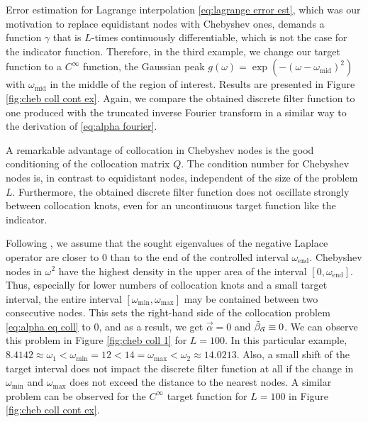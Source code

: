 \documentclass[a4paper,11pt,bibliography=totoc,listof=totoc,headinclude=true,cleardoublepage=empty,oneside]{scrbook}
\newcommand{\dffv}{\Tilde{\beta}_{\Vec{\alpha}}}
\newcommand{\e}{\mathrm{end}}
\begin{document}

\newpage
Error estimation for Lagrange interpolation \eqref{eq:lagrange error est}, which was our motivation to replace equidistant nodes with Chebyshev ones, demands a function $\gamma$ that is $L$-times continuously differentiable, which is not the case for the indicator function. Therefore, in the third example, we change our target function to a $C^\infty$ function, the Gaussian peak $g(\omega) = \exp\left(-(\omega-\omega_{\mathrm{mid}})^2\right)$ with $\omega_{\mathrm{mid}}$ in the middle of the region of interest. Results are presented in Figure \ref{fig:cheb coll cont ex}. Again, we compare the obtained discrete filter function to one produced with the truncated inverse Fourier transform in a similar way to the derivation of \eqref{eq:alpha fourier}.

A remarkable advantage of collocation in Chebyshev nodes is the good conditioning of the collocation matrix $Q$. The condition number for Chebyshev nodes is, in contrast to equidistant nodes, independent of the size of the problem $L$. Furthermore, the obtained discrete filter function does not oscillate strongly between collocation knots, even for an uncontinuous target function like the indicator.

Following \cite{nannen}, we assume that the sought eigenvalues of the negative Laplace operator are closer to 0 than to the end of the controlled interval $\omega_\e$. Chebyshev nodes in $\omega^2$ have the highest density in the upper area of the interval $[0, \omega_\e]$. Thus, especially for lower numbers of collocation knots and a small target interval, the entire interval $\left[\omega_{\min}, \omega_{\max} \right]$ may be contained between two consecutive nodes. This sets the right-hand side of the collocation problem \eqref{eq:alpha eq coll} to 0, and as a result, we get $\Vec{\alpha}=0$ and $\dffv \equiv 0$. We can observe this problem in Figure \ref{fig:cheb coll 1} for $L=100$. In this particular example, $ 8.4142\approx\omega_1 < \omega_{\min} = 12 < 14 = \omega_{\max} < \omega_2 \approx 14.0213 $. Also, a small shift of the target interval does not impact the discrete filter function at all if the change in $\omega_{\min}$ and $\omega_{\max}$ does not exceed the distance to the nearest nodes. A similar problem can be observed for the $C^\infty$ target function for $L=100$ in Figure \ref{fig:cheb coll cont ex}.
\end{document}
